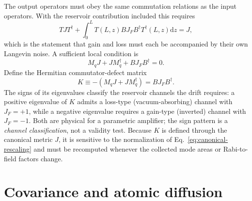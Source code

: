 \documentclass[11pt,a4paper]{article}
\newcommand{\dd}{\mathrm d}
\begin{document}
The output operators must obey the same commutation relations as the input
operators. With the reservoir contribution included this requires
\begin{equation}
\boxed{\;
TJT^\dagger+\int_0^L
T(L,z)BJ_FB^\dagger T^\dagger(L,z)\dd z=J ,\;}
\label{eq:commutator-integral}
\end{equation}
which is the statement that gain and loss must each be accompanied by their
own Langevin noise. A sufficient local condition is
\begin{equation}
\boxed{\;
M_qJ+JM_q^\dagger+BJ_FB^\dagger=0 .\;}
\label{eq:physical-realizability}
\end{equation}
Define the Hermitian commutator-defect matrix
\begin{equation}
K\equiv-\left(M_qJ+JM_q^\dagger\right)=BJ_FB^\dagger .
\label{eq:K-matrix}
\end{equation}
The signs of its eigenvalues classify the reservoir channels the drift
requires:
a positive eigenvalue of $K$ admits a loss-type (vacuum-absorbing) channel
with $J_F=+1$, while a negative eigenvalue requires a gain-type (inverted)
channel with $J_F=-1$. Both are physical for a parametric amplifier; the
sign pattern is a \emph{channel classification}, not a validity test. Because $K$
is defined through the canonical metric $J$, it is sensitive to the
normalization of Eq.~\eqref{eq:canonical-rescaling} and must be recomputed
whenever the collected mode areas or Rabi-to-field factors change.

\section{Covariance and atomic diffusion}
\end{document}

